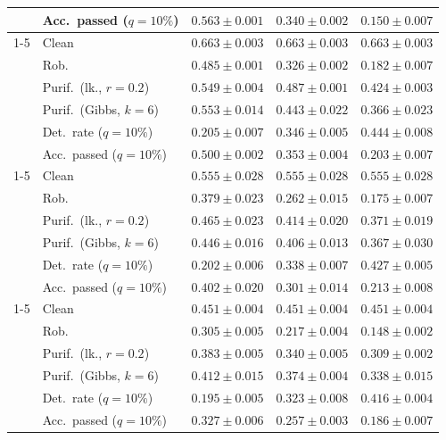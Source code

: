 \begin{table}[htbp]
\begin{tabular}{@{}llrrr@{}}
     & Acc.\ passed ($q{=}10\%$) & $0.563 \pm 0.001$ & $0.340 \pm 0.002$ & $0.150 \pm 0.007$ \\
    \cmidrule(lr){1-5}
    \multirow{6}{*}{$\alpha{=}0.2$} & Clean & $0.663 \pm 0.003$ & $0.663 \pm 0.003$ & $0.663 \pm 0.003$ \\
     & Rob. & $0.485 \pm 0.001$ & $0.326 \pm 0.002$ & $0.182 \pm 0.007$ \\
     & Purif.\ (lk., $r{=}0.2$) & $0.549 \pm 0.004$ & $0.487 \pm 0.001$ & $0.424 \pm 0.003$ \\
     & Purif.\ (Gibbs, $k{=}6$) & $0.553 \pm 0.014$ & $0.443 \pm 0.022$ & $0.366 \pm 0.023$ \\
     & Det.\ rate ($q{=}10\%$) & $0.205 \pm 0.007$ & $0.346 \pm 0.005$ & $0.444 \pm 0.008$ \\
     & Acc.\ passed ($q{=}10\%$) & $0.500 \pm 0.002$ & $0.353 \pm 0.004$ & $0.203 \pm 0.007$ \\
    \cmidrule(lr){1-5}
    \multirow{6}{*}{$\alpha{=}0.5$} & Clean & $0.555 \pm 0.028$ & $0.555 \pm 0.028$ & $0.555 \pm 0.028$ \\
     & Rob. & $0.379 \pm 0.023$ & $0.262 \pm 0.015$ & $0.175 \pm 0.007$ \\
     & Purif.\ (lk., $r{=}0.2$) & $0.465 \pm 0.023$ & $0.414 \pm 0.020$ & $0.371 \pm 0.019$ \\
     & Purif.\ (Gibbs, $k{=}6$) & $0.446 \pm 0.016$ & $0.406 \pm 0.013$ & $0.367 \pm 0.030$ \\
     & Det.\ rate ($q{=}10\%$) & $0.202 \pm 0.006$ & $0.338 \pm 0.007$ & $0.427 \pm 0.005$ \\
     & Acc.\ passed ($q{=}10\%$) & $0.402 \pm 0.020$ & $0.301 \pm 0.014$ & $0.213 \pm 0.008$ \\
    \cmidrule(lr){1-5}
    \multirow{6}{*}{$\alpha{=}1$} & Clean & $0.451 \pm 0.004$ & $0.451 \pm 0.004$ & $0.451 \pm 0.004$ \\
     & Rob. & $0.305 \pm 0.005$ & $0.217 \pm 0.004$ & $0.148 \pm 0.002$ \\
     & Purif.\ (lk., $r{=}0.2$) & $0.383 \pm 0.005$ & $0.340 \pm 0.005$ & $0.309 \pm 0.002$ \\
     & Purif.\ (Gibbs, $k{=}6$) & $0.412 \pm 0.015$ & $0.374 \pm 0.004$ & $0.338 \pm 0.015$ \\
     & Det.\ rate ($q{=}10\%$) & $0.195 \pm 0.005$ & $0.323 \pm 0.008$ & $0.416 \pm 0.004$ \\
     & Acc.\ passed ($q{=}10\%$) & $0.327 \pm 0.006$ & $0.257 \pm 0.003$ & $0.186 \pm 0.007$ \\

\end{tabular}
\end{table}
